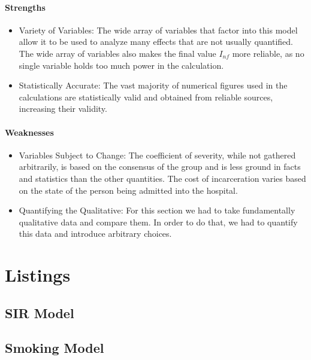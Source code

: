 \documentclass[12pt,letterpaper]{article}
\begin{document}
\paragraph{Strengths}
\begin{itemize}
\item Variety of Variables: The wide array of variables that factor into this model allow it to be used to analyze many effects that are not usually quantified. The wide array of variables also makes the final value $I_{nf}$ more reliable, as no single variable holds too much power in the calculation.
\item Statistically Accurate: The vast majority of numerical figures used in the calculations are statistically valid and obtained from reliable sources, increasing their validity.
\end{itemize}

\paragraph{Weaknesses}
\begin{itemize}
\item Variables Subject to Change: The coefficient of severity, while not gathered arbitrarily, is based on the consensus of the group and is less ground in facts and statistics than the other quantities. The cost of incarceration varies based on the state of the person being admitted into the hospital.
\item Quantifying the Qualitative: For this section we had to take fundamentally qualitative data and compare them. In order to do that, we had to quantify this data and introduce arbitrary choices.
\end{itemize}


\newpage
\printbibliography
% 
\newpage

\appendix
\listoffigures
\listoftables

\section{Listings}
\subsection{SIR Model}

\subsection{Smoking Model}

\end{document}

